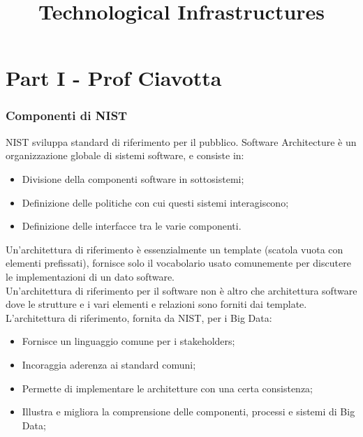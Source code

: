 \documentclass[11pt, twocolumn]{article}
\title{Technological Infrastructures}
\author{}
\date{}
\newenvironment{myitemize}
{ \begin{itemize}[topsep=0ex]
		\setlength{\itemsep}{0pt}
		\setlength{\parskip}{0pt}
		\setlength{\parsep}{0pt}     }
	{ \end{itemize}                  }
\begin{document}
\maketitle


\part*{Part I - Prof Ciavotta}

\section{Componenti di NIST}
NIST sviluppa standard di riferimento per il pubblico. Software Architecture è un organizzazione globale di sistemi software, e consiste in:
\begin{myitemize}
	\item Divisione della componenti software in sottosistemi; 
	\item Definizione delle politiche con cui questi sistemi interagiscono;
	\item Definizione delle interfacce tra le varie componenti.
\end{myitemize}
Un'architettura di riferimento è essenzialmente un template (scatola vuota con elementi prefissati), fornisce solo il vocabolario usato comunemente per discutere le implementazioni di un dato software.\\
Un'architettura di riferimento per il software non è altro che architettura software dove le strutture e i vari elementi e relazioni sono forniti dai template.
\\
L'architettura di riferimento, fornita da NIST, per i Big Data:
\begin{myitemize}
	\item Fornisce un linguaggio comune per i stakeholders;
	\item Incoraggia aderenza ai standard comuni;
	\item Permette di implementare le architetture con una certa consistenza;
	\item Illustra e migliora la comprensione delle componenti, processi e  sistemi di Big Data;
\end{myitemize}
\end{document}
